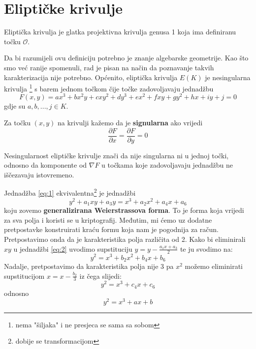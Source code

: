 \documentclass{mathos}
\begin{document}
\section{Eliptičke krivulje}

\begin{defin}
    Eliptička krivulja je glatka projektivna krivulja genusa 1 koja ima definiranu točku $\mathcal{O}$.
\end{defin}

Da bi razumijeli ovu definiciju potrebno je znanje algebarske geometrije. Kao što smo već ranije spomenuli, rad je pisan na način da poznavanje takvih karakterizacija nije potrebno. Općenito, eliptička krivulja $E(K)$ je nesingularna krivulja \footnote{nema "šiljaka" i ne presjeca se sama sa sobom} s barem jednom točkom čije točke zadovoljavaju jednadžbu
\begin{equation}
    \label{eq:1}
    F(x, y) = ax^3 + bx^2y + cxy^2 + dy^3 + ex^2 + fxy + gy^2 + hx + iy + j = 0
\end{equation}
gdje su $a, b, ..., j \in K$.

\begin{defin}
    Za točku $(x, y)$ na krivulji kažemo da je \textbf{signularna} ako vrijedi
    \[ \frac{\partial F}{\partial x} = \frac{\partial F}{\partial y} = 0 \]
\end{defin}

Nesingularnost eliptičke krivulje znači da nije singularna ni u jednoj točki, odnosno da komponente od $\nabla F$ u točkama koje zadovoljavaju jednadžbu ne iščezavaju istovremeno.

Jednadžba \ref{eq:1} ekvivalentna\footnote{dobije se transformacijom} je jednadžbi
\begin{equation}
    \label{eq:2}
    y^2 + a_1xy + a_3 y = x^3 + a_2 x^2 + a_4 x + a_6
\end{equation}
koju zovemo \textbf{generalizirana Weierstrassova forma}. To je forma koja vrijedi za sva polja i koristi se u kriptografij. Međutim, mi ćemo uz dodatne pretpostavke konstruirati kraću formu koja nam je pogodnija za račun. Pretpostavimo onda da je karakteristika polja različita od 2. Kako bi eliminirali $xy$ u jednadžbi \ref{eq:2} uvodimo supstituciju $y = y - \frac{a_1x + a_3}{2}$ te ju svodimo na:
\[ y^2 = x^3 + b_2x^2 + b_4x + b_6 \]
Nadalje, pretpostavimo da karakteristika polja nije 3 pa $x^2$ možemo eliminirati supstitucijom $x = x - \frac{b_2}{3}$ iz čega slijedi:
\[ y^2 = x^3 + c_4x + c_6 \]
odnosno
\begin{equation}
    \label{eq:3}
    y^2 = x^3 + ax + b
\end{equation}
\end{document}
